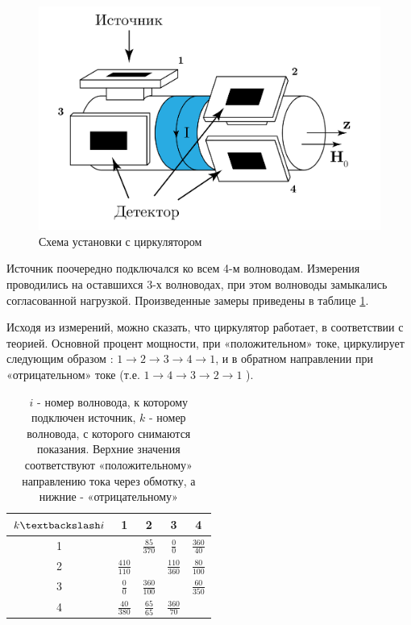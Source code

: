 \begin{figure}[h!]
    \centering
    \includegraphics[width = 0.6\linewidth]{imgs/circulator2.pdf}
    \caption{Схема установки с циркулятором}
    \label{fig:exp:circulator2}
\end{figure}

Источник поочередно подключался ко всем 4-м волноводам. Измерения проводились
на оставшихся 3-х волноводах, при этом волноводы замыкались согласованной
нагрузкой. Произведенные замеры приведены в таблице \ref{tab:faradey}.

Исходя из измерений, можно сказать, что циркулятор работает, в соответствии с теорией. Основной процент мощности, при
«положительном» токе, циркулирует следующим образом : $1 \rightarrow 2 \rightarrow 3 \rightarrow 4 \rightarrow 1$, и
в обратном направлении при «отрицательном» токе (т.е. $1 \rightarrow 4 \rightarrow 3 \rightarrow 2 \rightarrow 1$ ).

 \begin{table}[h!]
    \centering
    \bgroup
    \def\arraystretch{1.2}
    \begin{tabular}{|c|c|c|c|c|}
    \hline
     $k \textbackslash i$ & 1 & 2 & 3 & 4 \\ \hline
    1 & \cellcolor{black!70}  & $\frac{85}{370}$ & $\frac{0}{0}$& $\frac{360}{40}$  \\ \hline
    2 & $\frac{410}{110}$  &\cellcolor{black!70}   & $\frac{110}{360}$  & $\frac{80}{100}$  \\ \hline
    3 & $\frac{0}{0}$  & $\frac{360}{100}$  & \cellcolor{black!70}  &  $\frac{60}{350}$ \\ \hline
    4 & $\frac{40}{380}$  & $\frac{65}{65}$  & $\frac{360}{70}$  & \cellcolor{black!70} \\ \hline
    \end{tabular}
    \egroup
    \caption{$i$ - номер волновода, к которому подключен источник, $k$ - номер волновода, с которого снимаются
    показания. Верхние значения соответствуют «положительному» направлению тока через обмотку, а нижние - «отрицательному»}
    \label{tab:faradey}
    \end{table}

